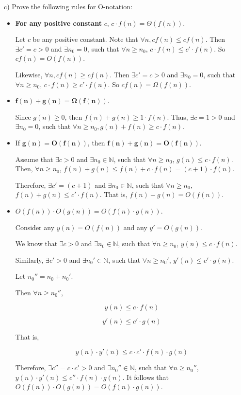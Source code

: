 \documentclass[a4paper]{article}
\begin{document}
\noindent c) Prove the following rules for O-notation:
\begin{itemize}
\item \textbf{For any positive constant} $c$, $c \cdot f(n) = \Theta(f(n))$.

Let $c$ be any positive constant. Note that $\forall n, c f(n) \le c f(n)$. Then $\exists c' = c > 0$ and $\exists n_0 = 0$, such that $\forall n \ge n_0$, $c\cdot f(n) \le c' \cdot f(n)$. So $c f(n) = O(f(n))$.

Likewise, $\forall n, c f(n) \ge c f(n)$. Then $\exists c' = c > 0$ and $\exists n_0 = 0$, such that $\forall n \ge n_0$, $c\cdot f(n) \ge c' \cdot f(n)$. So $c f(n) = \Omega(f(n))$.



\item $\mathbf{f(n) + g(n) = \Omega(f(n))}$.

Since $g(n) \ge 0$, then $f(n) + g(n) \ge 1 \cdot f(n)$. Thus, $\exists c = 1 > 0$ and $\exists n_0 = 0$, such that $\forall n \ge n_0, g(n) + f(n) \ge c \cdot f(n)$.

\item If $\mathbf{g(n) = O(f(n))}$, then $\mathbf{f(n) + g(n) = O(f(n))}$.

Assume that $\exists c > 0$ and $\exists n_0 \in 
\mathbb{N}$, such that $\forall n \ge n_0$, $g(n) \le c \cdot f(n)$.
Then, $\forall n \ge n_0$, $f(n) + g(n) \le f(n) + c \cdot f(n) = (c+1) \cdot f(n)$.

Therefore, $\exists c' = (c+1)$ and $\exists n_0 \in 
\mathbb{N}$, such that $\forall n \ge n_0$, $f(n) + g(n) \le c' \cdot f(n)$. That is, $f(n) + g(n) = O(f(n))$.


\item $O(f(n)) \cdot O(g(n)) = O(f(n) \cdot g(n))$.

Consider any $y(n) = O(f(n))$ and any $y' = O(g(n))$.

We know that $\exists c > 0$ and $\exists n_0 \in 
\mathbb{N}$, such that $\forall n \ge n_0$, $y(n) \le c \cdot f(n)$.

Similarly, $\exists c' > 0$ and $\exists n_0' \in 
\mathbb{N}$, such that $\forall n \ge n_0'$, $y'(n) \le c' \cdot g(n)$.

Let $n_0'' = n_0 + n_0'$.

Then $\forall n \ge n_0''$,

$$y(n) \le c \cdot f(n)$$

$$y'(n) \le c' \cdot g(n)$$

That is,

$$y(n) \cdot y'(n) \le c \cdot c' \cdot f(n) \cdot g(n)$$

Therefore, $\exists c'' = c \cdot c' > 0$ and $\exists n_0'' \in 
\mathbb{N}$, such that $\forall n \ge n_0''$, $y(n)\cdot y'(n) \le c'' \cdot f(n) \cdot g(n)$. It follows that $O(f(n)) \cdot O(g(n)) = O(f(n) \cdot g(n))$.

\end{itemize}
\end{document}
